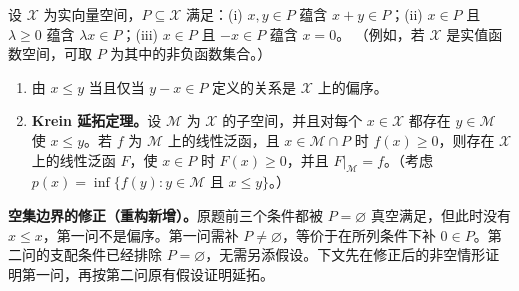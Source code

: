 \documentclass[../../main.tex]{subfiles}
\begin{document}
\begin{exercise}\label{exercise:ch05-krein-extension}
设 $\mathcal X$ 为实向量空间，$P\subseteq\mathcal X$ 满足：(i) $x,y\in P$ 蕴含 $x+y\in P$；(ii) $x\in P$ 且 $\lambda\ge0$ 蕴含 $\lambda x\in P$；(iii) $x\in P$ 且 $-x\in P$ 蕴含 $x=0$。
（例如，若 $\mathcal X$ 是实值函数空间，可取 $P$ 为其中的非负函数集合。）
\begin{enumerate}
\item\label{item:ch05-cone-partial-order} 由 $x\le y$ 当且仅当 $y-x\in P$ 定义的关系是 $\mathcal X$ 上的偏序。
\item\label{item:ch05-krein-positive-extension} \textbf{Krein 延拓定理。}设 $\mathcal M$ 为 $\mathcal X$ 的子空间，并且对每个 $x\in\mathcal X$ 都存在 $y\in\mathcal M$ 使 $x\le y$。若 $f$ 为 $\mathcal M$ 上的线性泛函，且 $x\in\mathcal M\cap P$ 时 $f(x)\ge0$，则存在 $\mathcal X$ 上的线性泛函 $F$，使 $x\in P$ 时 $F(x)\ge0$，并且 $F|_{\mathcal M}=f$。（考虑 $p(x)=\inf\{f(y):y\in\mathcal M\text{ 且 }x\le y\}$。）
\end{enumerate}
\end{exercise}
\begin{remark}
\textbf{空集边界的修正（重构新增）。}原题前三个条件都被 $P=\varnothing$ 真空满足，但此时没有 $x\le x$，第一问不是偏序。第一问需补 $P\ne\varnothing$，等价于在所列条件下补 $0\in P$。第二问的支配条件已经排除 $P=\varnothing$，无需另添假设。下文先在修正后的非空情形证明第一问，再按第二问原有假设证明延拓。
\end{remark}
\end{document}
